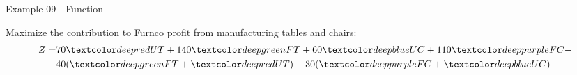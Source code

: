 \begin{frame}{Example 09 - Function}

Maximize the contribution to Furnco profit from manufacturing tables and chairs:
\begin{align*}
    Z = &70\colora{UT} + 140\colorb{FT} + 60\colorc{UC} + 110\colord{FC} - \\
        &40(\colorb{FT} + \colora{UT}) - 30(\colord{FC} + \colorc{UC})
\end{align*}

\end{frame}
